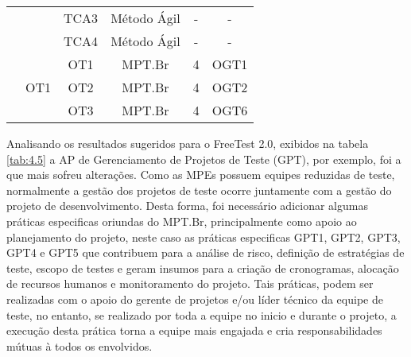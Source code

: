 \begin{table}[H]
{\begin{tabular}{|c|c|c|c|c|c|}
                                                                                      & \multicolumn{1}{l|}{}                     & \multicolumn{1}{l|}{TCA3} & \multicolumn{1}{l|}{Método Ágil} & -                                                                               & -                                                                                    \\ \cline{3-6} 
                                                                                      & \multicolumn{1}{l|}{}                     & \multicolumn{1}{l|}{TCA4} & \multicolumn{1}{l|}{Método Ágil} & -                                                                               & -                                                                                    \\ \cline{2-6} 
                                                                                      & \multirow{3}{*}{OT1}                      & OT1                       & MPT.Br                           & 4                                                                               & OGT1                                                                                 \\ \cline{3-6} 
                                                                                      &                                           & OT2                       & MPT.Br                           & 4                                                                               & OGT2                                                                                 \\ \cline{3-6} 
                                                                                      &                                           & OT3                       & MPT.Br                           & 4                                                                               & OGT6                                                                                 \\ \hline
\end{tabular}
}
\end{table}


Analisando os resultados sugeridos para o FreeTest 2.0, exibidos na tabela \ref{tab:4.5} a AP de Gerenciamento de Projetos de Teste (GPT), por exemplo, foi a que mais sofreu alterações. Como as MPEs possuem equipes reduzidas de teste, normalmente a gestão dos projetos de teste ocorre juntamente com a gestão do projeto de desenvolvimento. Desta forma, foi necessário adicionar algumas práticas especificas oriundas do MPT.Br, principalmente como apoio ao planejamento do projeto, neste caso as práticas especificas GPT1, GPT2, GPT3, GPT4 e GPT5 que contribuem para a análise de risco, definição de estratégias de teste, escopo de testes e geram insumos para a criação de cronogramas, alocação de recursos humanos e monitoramento do projeto. Tais práticas, podem ser realizadas com o apoio do gerente de projetos e/ou líder técnico da equipe de teste, no entanto, se realizado por toda a equipe no inicio e durante o projeto, a execução desta prática torna a equipe mais engajada e cria responsabilidades mútuas à todos os envolvidos. 


